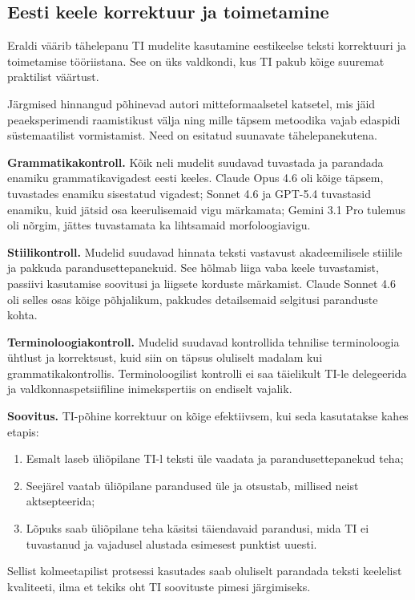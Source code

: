 \subsection{Eesti keele korrektuur ja toimetamine} \label{subsec:korrektuur}

Eraldi väärib tähelepanu TI mudelite kasutamine eestikeelse teksti korrektuuri ja toimetamise tööriistana. See on üks valdkondi, kus TI pakub kõige suuremat praktilist väärtust.

Järgmised hinnangud põhinevad autori mitteformaalsetel katsetel, mis jäid peaeksperimendi raamistikust välja ning mille täpsem metoodika vajab edaspidi süstemaatilist vormistamist. Need on esitatud suunavate tähelepanekutena.

\textbf{Grammatikakontroll.} Kõik neli mudelit suudavad tuvastada ja parandada enamiku grammatikavigadest eesti keeles. Claude Opus 4.6 oli kõige täpsem, tuvastades enamiku sisestatud vigadest; Sonnet 4.6 ja GPT-5.4 tuvastasid enamiku, kuid jätsid osa keerulisemaid vigu märkamata; Gemini 3.1 Pro tulemus oli nõrgim, jättes tuvastamata ka lihtsamaid morfoloogiavigu.

\textbf{Stiilikontroll.} Mudelid suudavad hinnata teksti vastavust akadeemilisele stiilile ja pakkuda parandusettepanekuid. See hõlmab liiga vaba keele tuvastamist, passiivi kasutamise soovitusi ja liigsete korduste märkamist. Claude Sonnet 4.6 oli selles osas kõige põhjalikum, pakkudes detailsemaid selgitusi paranduste kohta.

\textbf{Terminoloogiakontroll.} Mudelid suudavad kontrollida tehnilise terminoloogia ühtlust ja korrektsust, kuid siin on täpsus oluliselt madalam kui grammatikakontrollis. Terminoloogilist kontrolli ei saa täielikult TI-le delegeerida ja valdkonnaspetsiifiline inimekspertiis on endiselt vajalik.

\textbf{Soovitus.} TI-põhine korrektuur on kõige efektiivsem, kui seda kasutatakse kahes etapis:
\begin{enumerate}
    \item Esmalt laseb üliõpilane TI-l teksti üle vaadata ja parandusettepanekud teha;
    \item Seejärel vaatab üliõpilane parandused üle ja otsustab, millised neist aktsepteerida;
    \item Lõpuks saab üliõpilane teha käsitsi täiendavaid parandusi, mida TI ei tuvastanud ja vajadusel alustada esimesest punktist uuesti.
\end{enumerate}

Sellist kolmeetapilist protsessi kasutades saab oluliselt parandada teksti keelelist kvaliteeti, ilma et tekiks oht TI soovituste pimesi järgimiseks.

